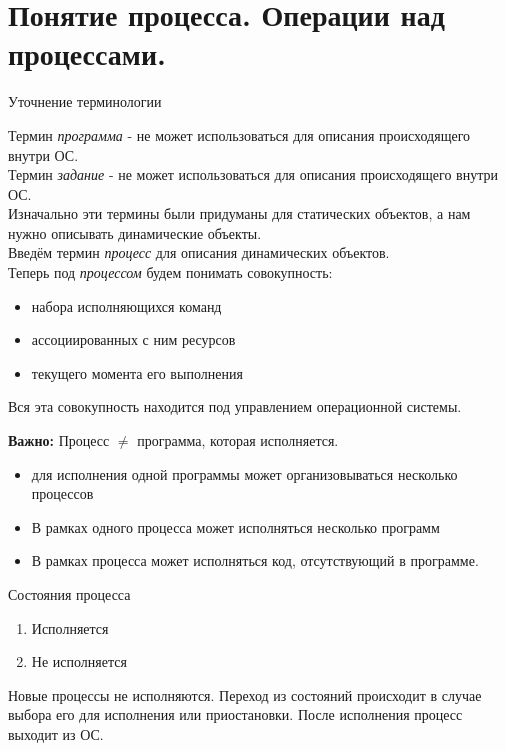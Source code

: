 \documentclass[12pt, a4paper]{article}
\newcommand{\mytab}{\hspace{0.5cm}}
\begin{document}
    \section{Понятие процесса. Операции над процессами.}
    \begin{center}
        Уточнение терминологии
    \end{center}
    Термин \textit{программа} - не может использоваться для описания происходящего внутри ОС.\\
    Термин \textit{задание} - не может использоваться для описания происходящего внутри ОС.\\
    Изначально эти термины были придуманы для статических объектов, а нам нужно описывать динамические 
    объекты.\\
    Введём термин \textit{процесс} для описания динамических объектов.\\
    Теперь под \textit{процессом} будем понимать совокупность:
    \begin{itemize}
        \item набора исполняющихся команд
        \item ассоциированных с ним ресурсов 
        \item текущего момента его выполнения
    \end{itemize} 
    \mytab Вся эта совокупность находится под управлением операционной системы.\par
    \textbf{Важно:} Процесс $\neq$ программа, которая исполняется.
    \begin{itemize}
        \item для исполнения одной программы может организовываться несколько процессов 
        \item В рамках одного процесса может исполняться несколько программ 
        \item В рамках процесса может исполняться код, отсутствующий в программе.
    \end{itemize}
    \begin{center}
        Состояния процесса
    \end{center}
    \begin{enumerate}
        \item Исполняется 
        \item Не исполняется
    \end{enumerate}
    Новые процессы не исполняются. Переход из состояний происходит в случае 
    выбора его для исполнения или приостановки. После исполнения процесс выходит из ОС.\par
\end{document}
